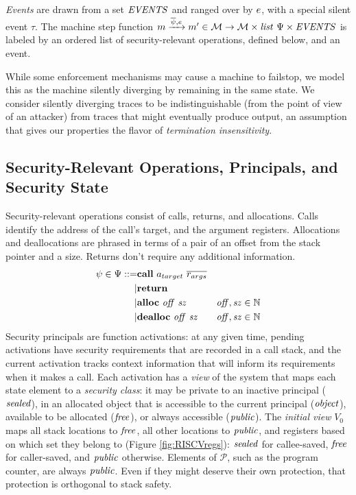 \documentclass[10pt,conference]{ieeetran}%
\theoremstyle{definition}
\begin{document}
{\em Events} are drawn from a set \(\mathit{EVENTS}\) and ranged over by \(e\), with a
special silent event \(\tau\).
The machine step function
\(m \xrightarrow{\overline{\psi},e} m' \in {\mathcal M} \rightarrow
{\mathcal M} \times \mathit{list} ~ \Psi \times \mathit{EVENTS}\)
is labeled by an ordered list of security-relevant operations, defined below,
and an event.

While some enforcement mechanisms may cause a machine to
failstop, we model this as the machine silently diverging by remaining in the
same state. We consider silently diverging traces to be indistinguishable
(from the point of view of an attacker) from traces that might eventually
produce output, an assumption that gives our properties the flavor of
{\it termination insensitivity}.

\subsection{Security-Relevant Operations, Principals, and Security State}

Security-relevant operations consist of calls, returns, and allocations.
Calls identify the address of the call's target,
and the argument registers. Allocations and deallocations are phrased in terms of a pair
of an offset from the stack pointer and a size. Returns don't require any additional information.
%
\begin{align*}
  \psi \in \Psi ::= & \mathbf{call} ~ a_{target} ~ \overline{r_{args}} & \\
  | & \mathbf{return} & \\
  | & \mathbf{alloc} ~ \mathit{off ~ sz} & \mathit{off, sz} \in \mathbb{N} \\
  | & \mathbf{dealloc} ~ \mathit{off ~ sz} & \mathit{off, sz} \in \mathbb{N} \\
\end{align*}
%
Security principals are function activations: at any given time, pending activations
have security requirements that are recorded in a call stack, and the current
activation tracks context information that will inform its requirements when
it makes a call. Each activation has a {\it view}
of the system that maps each state element to a {\it security class}:
it may be private to an inactive principal (\(\mathit{sealed}\)),
in an allocated object that is accessible to the current principal (\(\mathit{object}\)),
available to be allocated (\(\mathit{free}\)), or
always accessible (\(\mathit{public}\)). The {\it initial view} \(V_0\) maps all stack locations to \(\mathit{free}\),
all other locations to \(\mathit{public}\), and registers based on which set they
belong to (Figure \ref{fig:RISCVregs}): \(\mathit{sealed}\) for callee-saved,
\(\mathit{free}\) for caller-saved, and \(\mathit{public}\) otherwise. Elements of \(\mathcal{P}\),
such as the program counter, are always \(\mathit{public}\). Even if they might deserve their
own protection, that protection is orthogonal to stack safety.
\end{document}
